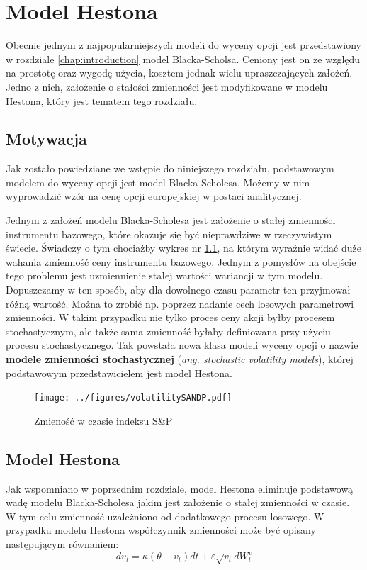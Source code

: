 \documentclass{pracamgr}
\begin{document}
\chapter{Model Hestona}
\label{chap:hestonModel}

Obecnie jednym z najpopularniejszych modeli do wyceny opcji jest przedstawiony 
w rozdziale \ref{chap:introduction} model Blacka-Scholsa. Ceniony jest 
on ze względu na prostotę oraz wygodę użycia, kosztem jednak wielu upraszczających założeń. 
Jedno z nich, założenie o stałości zmienności jest modyfikowane w modelu Hestona, który jest 
tematem tego rozdziału.


\section{Motywacja} 
Jak zostało powiedziane we wstępie do niniejszego rozdziału, podstawowym modelem do wyceny opcji jest 
model Blacka-Scholesa.
Możemy w nim wyprowadzić wzór na cenę opcji europejskiej w postaci analitycznej. 

Jednym z założeń modelu Blacka-Scholesa jest założenie o stałej zmienności instrumentu bazowego, 
które okazuje się być nieprawdziwe w rzeczywistym świecie. Świadczy o tym chociażby
wykres nr \ref{fig:vix}, na którym wyraźnie widać duże wahania zmienność ceny instrumentu bazowego.
Jednym z pomysłów na
obejście tego problemu jest uzmiennienie stałej wartości wariancji w tym modelu. Dopuszczamy w ten 
sposób, aby dla dowolnego czasu parametr ten przyjmował różną wartość. Można to zrobić np. poprzez 
nadanie cech losowych parametrowi zmienności. 
W takim przypadku nie tylko proces ceny akcji byłby procesem 
stochastycznym, ale także sama zmienność byłaby definiowana przy użyciu procesu stochastycznego. 
Tak powstała nowa klasa modeli wyceny opcji o nazwie \textbf{modele zmienności stochastycznej} 
(\textit{ang. stochastic volatility models}), której podstawowym 
przedstawicielem jest model Hestona.



\begin{figure}
  \centering  
  \texttt{[image: ../figures/volatilitySANDP.pdf]}
  \caption{Zmieność w czasie indeksu S\&P}\label{fig:vix}
\end{figure} 

\section{Model Hestona}
Jak wspomniano w poprzednim rozdziale, model Hestona eliminuje podstawową wadę modelu Blacka-Scholesa 
jakim jest założenie o stałej zmienności w czasie.
W tym celu zmienność uzależniono od dodatkowego procesu losowego. W 
przypadku modelu Hestona współczynnik zmienności może być opisany następującym równaniem:
\begin{equation}
\label{eq:cir}
dv_t  = \kappa (\theta  - v_t)dt + \varepsilon \sqrt{v_t} dW_t^v 
\end{equation}
\end{document}
